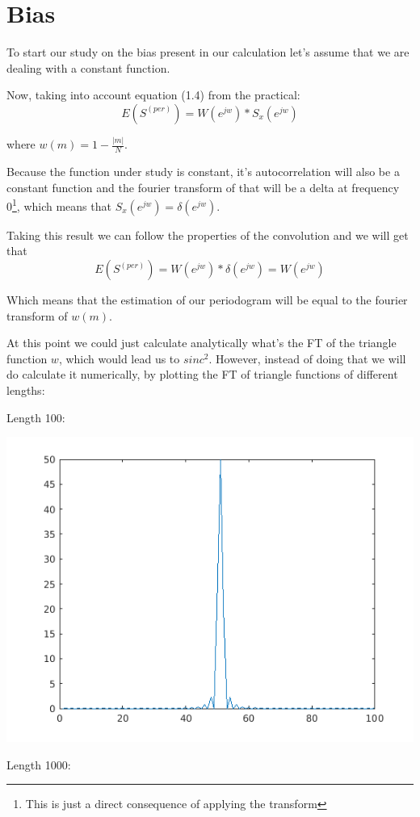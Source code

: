 \documentclass[conference,9pt]{IEEEtran}
\begin{document}
\section{Bias}
To start our study on the bias present in our calculation let's assume that we are dealing with a constant function.

Now, taking into account equation (1.4) from the practical:
$$E(S^{(per)})=W(e^{jw})*S_x(e^{jw})$$

where $w(m)=1-\frac{|m|}{N}$.

Because the function under study is constant, it's autocorrelation will also be a constant function and the fourier transform of that will be a delta at frequency 0\footnote{This is just a direct consequence of applying the transform}, which means that $S_x(e^{jw})=\delta(e^{jw})$.

Taking this result we can follow the properties of the convolution and we will get that 
$$E(S^{(per)})=W(e^{jw})*\delta(e^{jw})=W(e^{jw})$$

Which means that the estimation of our periodogram will be equal to the fourier transform of $w(m)$.

At this point we could just calculate analytically what's the FT of the triangle function $w$, which would lead us to $sinc^2$. However, instead of doing that we will do calculate it numerically, by plotting the FT of triangle functions of different lengths:

Length 100:

\includegraphics[scale=0.6]{triang100.png}

Length 1000:
\end{document}
